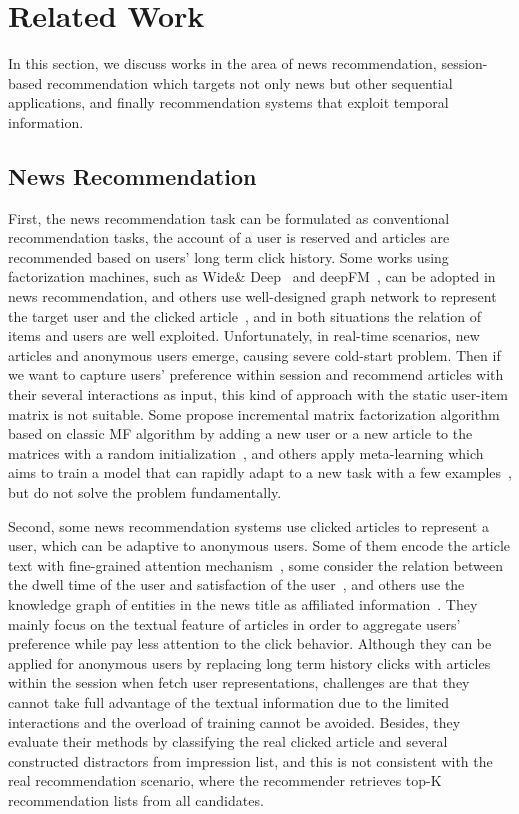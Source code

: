 \section{Related Work}
In this section, we discuss works in the area of news recommendation, session-based
recommendation which targets not only news but other sequential applications, and
finally recommendation systems that exploit temporal information.

\subsection{News Recommendation}
First, the news recommendation task can be formulated as conventional recommendation tasks, the account of a user is reserved and articles are recommended based on users' long term click history. Some works using factorization machines, such as Wide\& Deep~\cite{cheng2016wide} and deepFM~\cite{guodeepfm2017}, can be adopted in news recommendation, and others use well-designed graph network to represent the target user and the clicked article~\cite{hu2020graph, ge2020graph}, and in both situations the relation of items and users are well exploited. Unfortunately, in real-time scenarios, new articles and anonymous users emerge, causing severe cold-start problem. Then if we want to capture users' preference within session and recommend articles with their several interactions as input, this kind of approach with the static user-item matrix is not suitable. Some propose incremental matrix factorization algorithm based on classic MF algorithm by adding a new user or a new article to the matrices with a random initialization~\cite{al2018adaptive}, and others apply meta-learning which aims to train a model that can rapidly adapt to a new task with a few examples~\cite{lee_melu:_2019}, but do not solve the problem fundamentally.

Second, some news recommendation systems use clicked articles to represent a user, which can be adaptive to anonymous users. Some of them encode the article text with fine-grained attention mechanism~\cite{zhu2019dan, wu_neural_2019-1, wu2019npa, wang2020fine}, some consider the relation between the dwell time of the user and satisfaction of the user~\cite{wu2020CPRS}, and others use the knowledge graph of entities in the news title as affiliated information~\cite{wang2018dkn, wang_ripplenet:_2018}. They mainly focus on the textual feature of articles in order to aggregate users' preference while pay less attention to the click behavior. Although they can be applied for anonymous users by replacing long term history clicks with articles within the session when fetch user representations, challenges are that they cannot take full advantage of the textual information due to the limited interactions and the overload of training cannot be avoided. Besides, they evaluate their methods by classifying the real clicked article and several constructed distractors from impression list, and this is not consistent with the real recommendation scenario, where the recommender retrieves top-K recommendation lists from all candidates.

